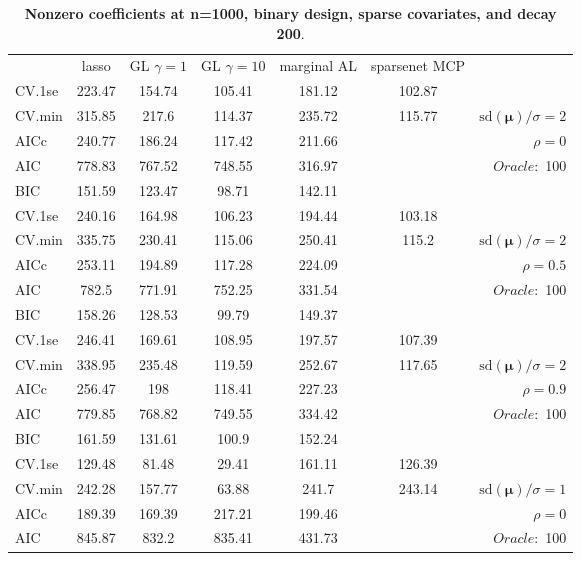 \begin{table}\vspace{-.5cm}
\caption[l]{ { \bf Nonzero coefficients at n=1000, binary design, 
sparse covariates, and  decay  200}.}
\vspace{-.5cm}
\footnotesize{}
\begin{center}
\begin{tabular}{l*{5}{c}|r}
& lasso & GL $\gamma=1$ & GL $\gamma=10$ & marginal AL & sparsenet MCP  & \\
 \cline{1-7}
CV.1se & 223.47 & 154.74 & 105.41 & 181.12 & 102.87 & \\
CV.min & 315.85 & 217.6 & 114.37 & 235.72 & 115.77 &  $\mathrm{sd}(\mathbf{\mu})/\sigma=2$ \\
AICc & 240.77 & 186.24 & 117.42 & 211.66 & & $\rho=0$ \\
AIC & 778.83 & 767.52 & 748.55 & 316.97 & &  \multirow{2}{*}{$Oracle: $ 100} \\
BIC & 151.59 & 123.47 & 98.71 & 142.11 & &  \\
 \hline 
CV.1se & 240.16 & 164.98 & 106.23 & 194.44 & 103.18 & \\
CV.min & 335.75 & 230.41 & 115.06 & 250.41 & 115.2 &  $\mathrm{sd}(\mathbf{\mu})/\sigma=2$ \\
AICc & 253.11 & 194.89 & 117.28 & 224.09 & & $\rho=0.5$ \\
AIC & 782.5 & 771.91 & 752.25 & 331.54 & &  \multirow{2}{*}{$Oracle: $ 100} \\
BIC & 158.26 & 128.53 & 99.79 & 149.37 & &  \\
 \hline 
CV.1se & 246.41 & 169.61 & 108.95 & 197.57 & 107.39 & \\
CV.min & 338.95 & 235.48 & 119.59 & 252.67 & 117.65 &  $\mathrm{sd}(\mathbf{\mu})/\sigma=2$ \\
AICc & 256.47 & 198 & 118.41 & 227.23 & & $\rho=0.9$ \\
AIC & 779.85 & 768.82 & 749.55 & 334.42 & &  \multirow{2}{*}{$Oracle: $ 100} \\
BIC & 161.59 & 131.61 & 100.9 & 152.24 & &  \\
 \hline 
CV.1se & 129.48 & 81.48 & 29.41 & 161.11 & 126.39 & \\
CV.min & 242.28 & 157.77 & 63.88 & 241.7 & 243.14 &  $\mathrm{sd}(\mathbf{\mu})/\sigma=1$ \\
AICc & 189.39 & 169.39 & 217.21 & 199.46 & & $\rho=0$ \\
AIC & 845.87 & 832.2 & 835.41 & 431.73 & &  \multirow{2}{*}{$Oracle: $ 100} \\

\end{tabular}
\end{center}
\end{table}
